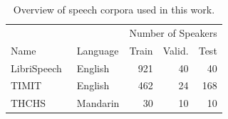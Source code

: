 %
\begin{table}
  \centering
  \caption{Overview of speech corpora used in this work.}%
\label{tab:corpora}
\begin{tabular}{llrrr}
  \toprule
  & & \multicolumn{3}{c}{Number of Speakers} \\
  \cmidrule(r){3-5}
  Name & Language &  Train & Valid. & Test\\
  \midrule
  LibriSpeech~\cite{panayotov15} & English & 921 & 40 & 40 \\
  TIMIT~\cite{TIMIT93} & English & 462 & 24 & 168 \\
  THCHS~\cite{THCHS15} & Mandarin & 30 & 10 & 10 \\
  \bottomrule
  \end{tabular}
\end{table}

